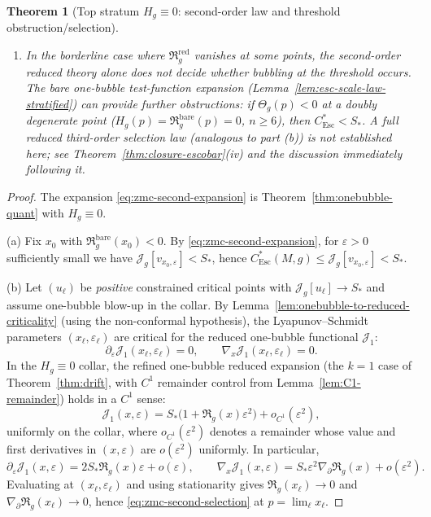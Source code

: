 \documentclass[11pt,reqno,a4paper]{amsart}
\numberwithin{equation}{section}
\theoremstyle{plain}
\newtheorem{theorem}{Theorem}[section]
\theoremstyle{remark}
\theoremstyle{plain}
\begin{document}
\begin{theorem}[Top stratum $H_g\equiv0$: second-order law and threshold obstruction/selection]
\begin{enumerate}[label=(\alph*)]
\item In the borderline case where $\mathfrak R_g^{\mathrm{red}}$ vanishes at some points, the second-order reduced theory alone does not decide
whether bubbling at the threshold occurs. The \emph{bare} one-bubble test-function expansion
(Lemma~\ref{lem:esc-scale-law-stratified}) can provide further obstructions: if
$\Theta_g(p)<0$ at a doubly degenerate point ($H_g(p)=\mathfrak R_g^{\mathrm{bare}}(p)=0$, $n\ge6$),
then $C^*_{\mathrm{Esc}}<S_\ast$.
A full \emph{reduced} third-order selection law (analogous to part (b)) is not established
here; see Theorem~\ref{thm:closure-escobar}(iv) and the discussion immediately following it.
\end{enumerate}
\end{theorem}

\begin{proof}
The expansion \eqref{eq:zmc-second-expansion} is Theorem~\ref{thm:onebubble-quant} with $H_g\equiv0$.

\smallskip
(a) Fix $x_0$ with $\mathfrak R_g^{\mathrm{bare}}(x_0)<0$. By \eqref{eq:zmc-second-expansion}, for $\varepsilon>0$ sufficiently small
we have $\mathcal J_g[v_{x_0,\varepsilon}]<S_\ast$, hence $C^*_{\mathrm{Esc}}(M,g)\le\mathcal J_g[v_{x_0,\varepsilon}]<S_\ast$.

\smallskip
(b) Let $(u_\ell)$ be \emph{positive} constrained critical points with $\mathcal J_g[u_\ell]\to S_\ast$ and assume one-bubble blow-up in the
collar. By Lemma~\ref{lem:onebubble-to-reduced-criticality} (using the non-conformal
hypothesis), the Lyapunov--Schmidt parameters $(x_\ell,\varepsilon_\ell)$ are
critical for the reduced one-bubble functional $\mathcal J_1$:
\[
\partial_\varepsilon \mathcal J_1(x_\ell,\varepsilon_\ell)=0,
\qquad
\nabla_{x}\mathcal J_1(x_\ell,\varepsilon_\ell)=0.
\]
In the $H_g\equiv0$ collar, the refined one-bubble reduced expansion (the $k=1$ case of Theorem~\ref{thm:drift},
with $C^1$ remainder control from Lemma~\ref{lem:C1-remainder})
holds in a $C^1$ sense:
\[
\mathcal J_1(x,\varepsilon)
= S_\ast\Big(1+\mathfrak R_g(x)\varepsilon^2\Big)+o_{C^1}(\varepsilon^2),
\]
uniformly on the collar, where $o_{C^1}(\varepsilon^2)$ denotes a remainder whose value and first derivatives in
$(x,\varepsilon)$ are $o(\varepsilon^2)$ uniformly. In particular,
\[
\partial_\varepsilon \mathcal J_1(x,\varepsilon)=2S_\ast\mathfrak R_g(x)\varepsilon+o(\varepsilon),
\qquad
\nabla_x \mathcal J_1(x,\varepsilon)=S_\ast\varepsilon^2\nabla_{\partial}\mathfrak R_g(x)+o(\varepsilon^2).
\]
Evaluating at $(x_\ell,\varepsilon_\ell)$ and using stationarity gives $\mathfrak R_g(x_\ell)\to0$ and
$\nabla_{\partial}\mathfrak R_g(x_\ell)\to0$, hence \eqref{eq:zmc-second-selection} at $p=\lim_\ell x_\ell$.


\end{proof}
\end{document}
